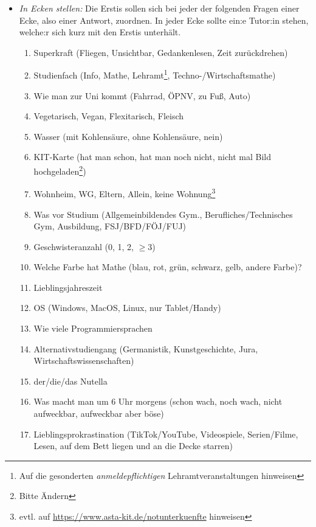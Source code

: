 \documentclass[10pt,ngerman]{scrartcl}
\begin{document}
\begin{multicols}{2}
\begin{itemize}
    \item \emph{In Ecken stellen:} Die Erstis sollen sich bei jeder der
        folgenden Fragen einer Ecke, also einer Antwort, zuordnen. In jeder Ecke
        sollte ein:e Tutor:in stehen, welche:r sich kurz mit den Erstis
        unterhält.
        \begin{enumerate}
            \item Superkraft (Fliegen, Unsichtbar, Gedankenlesen, Zeit zurückdrehen)
            \item Studienfach (Info, Mathe, Lehramt\footnote{Auf die gesonderten \emph{anmeldepflichtigen} Lehramtveranstaltungen hinweisen}, Techno-/Wirtschaftsmathe)
            \item Wie man zur Uni kommt (Fahrrad, ÖPNV, zu Fuß, Auto)
            \item Vegetarisch, Vegan, Flexitarisch, Fleisch
            \item Wasser (mit Kohlensäure, ohne Kohlensäure, nein)
            \item KIT-Karte (hat man schon, hat man noch nicht, nicht mal Bild hochgeladen\footnote{Bitte Ändern})
            \item Wohnheim, WG, Eltern, Allein, keine Wohnung\footnote{evtl. auf \href{https://www.asta-kit.de/notunterkuenfte}{https://www.asta-kit.de/notunterkuenfte} hinweisen}
            \item Was vor Studium (Allgemeinbildendes Gym., Berufliches/Technisches Gym, Ausbildung, FSJ/BFD/FÖJ/FUJ)
            \item Geschwisteranzahl (0, 1, 2, $\geq 3$)
            \item Welche Farbe hat Mathe (blau, rot, grün, schwarz, gelb, andere Farbe)?
            \item Lieblingsjahreszeit 
            \item OS (Windows, MacOS, Linux, nur Tablet/Handy)
            \item Wie viele Programmiersprachen
            \item Alternativstudiengang (Germanistik, Kunstgeschichte, Jura, Wirtschaftswissenschaften)
            \item der/die/das Nutella
            \item Was macht man um 6 Uhr morgens (schon wach, noch wach, nicht aufweckbar, aufweckbar aber böse)
            \item Lieblingsprokrastination (TikTok/YouTube, Videospiele, Serien/Filme, Lesen, auf dem Bett liegen und an die Decke starren)
        \end{enumerate}


\end{itemize}
\end{multicols}
\end{document}
